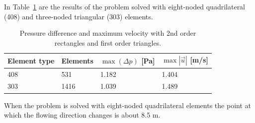 In Table~\ref{tb:struct2_2} are the results of the problem solved with 
eight-noded quadrilateral (408) and three-noded triangular (303) elements.  

\begin{table}[htbp]
\centering
\begin{tabular}{l l l l} \hline
Element type  & Elements & $\max (\Delta p)$ [Pa] & $\max |\vec{u}|$ [m/s] \\ \hline
408 &  531 & 1.182  & 1.404  \\
303 & 1416 & 1.039  & 1.489  \\ \hline
\end{tabular}
\caption{Pressure difference and maximum velocity with 2nd order
rectangles and first order triangles.}\label{tb:struct2_2}
\end{table}

When the problem is solved with eight-noded quadrilateral elements the point
at which the flowing direction changes is about 8.5 m.







